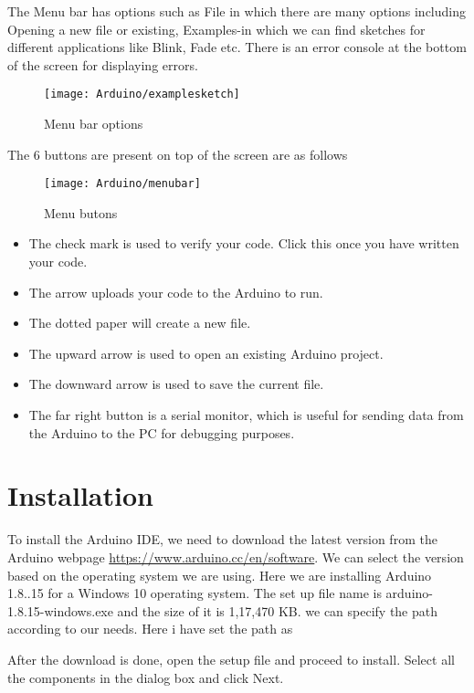 The Menu bar has options such as File in which there are many options including Opening a new file or existing,  Examples-in which we can find sketches for different applications like Blink, Fade etc.  There is an error console at the bottom  of the screen for displaying errors. 
\begin{figure}[H]
	\centering
	\texttt{[image: Arduino/examplesketch]}
	\caption{Menu bar options}\label{figure 4.1}
\end{figure}

The 6 buttons are present on top of the screen are as follows
\begin{figure}[H]
	\centering
	\texttt{[image: Arduino/menubar]}
	\caption{Menu butons}\label{figure 4.2}
\end{figure}
\begin{itemize}
	\item	The check mark is used to verify your code. Click this once you have written your code.
	\item	The arrow uploads your code to the Arduino to run.
	\item	The dotted paper will create a new file.
	\item	The upward arrow is used to open an existing Arduino project.
	\item	The downward arrow is used to save the current file.
	\item	The far right button is a serial monitor, which is useful for sending data from the Arduino to the PC for debugging purposes.
\end{itemize}

\section{Installation}

To install the Arduino IDE, we need to download the latest version from the Arduino webpage \url{https://www.arduino.cc/en/software}. We can select the version based on the operating system we are using. Here we are installing Arduino 1.8..15 for a Windows 10 operating system. 
The set up file name is arduino-1.8.15-windows.exe and the size of it is 1,17,470 KB. we can specify the path according to our needs. Here i have set the path as 

After the download is done, open the setup file and proceed to install.
Select all the components in the dialog box and click Next.

